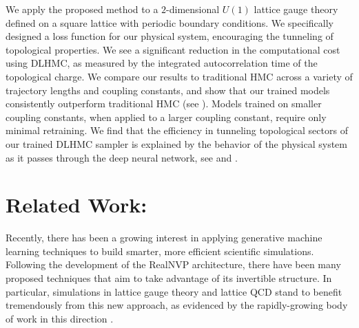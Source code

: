 \documentclass{article} %
\begin{document}
We apply the proposed method to a \(2\)-dimensional \(U(1)\) lattice gauge theory defined on a
      square lattice with periodic boundary conditions.
We specifically designed a loss function for our physical system,
encouraging the tunneling of topological properties.
      We see a significant reduction in the
      computational cost using DLHMC, as measured by the integrated autocorrelation time of the topological charge.
      We compare our results to traditional HMC across a variety of trajectory lengths and coupling constants,
      and show that our trained models consistently outperform traditional HMC (see
      ).
      Models trained on smaller coupling constants, when applied to a larger coupling constant, require
      only minimal retraining.
%
We find that the efficiency in tunneling topological sectors of our trained DLHMC sampler
is explained by the behavior of the physical system as it passes through the deep neural network,
see  and .
%
\section{\label{sec:relatedwork}Related Work:}
Recently, there has been a growing interest in applying generative machine learning techniques to build smarter, more efficient scientific simulations.
%
Following the development of the RealNVP \citep{dinhRealNVP} architecture, there have been many proposed techniques that aim to take advantage of its invertible structure.
%
In particular, simulations in lattice gauge theory and lattice QCD stand to benefit tremendously from this new approach, as evidenced by the rapidly-growing body of work in this direction 
\citep{%
   albergo2019flow,albergo2021introduction,favoni2020lattice,medvidovic2020generative,neklyudov2020orbital,
   neklyudov2020involutive, li2020neural,boyda2020sampling,kanwar2020equivariant,toth2019hamiltonian,
   hoffman2019neutra,wehenkel2020you,pasarica2010adaptively,dinhRealNVP,tanaka2017towards,
   rezende2020normalizing%
}.

\end{document}
